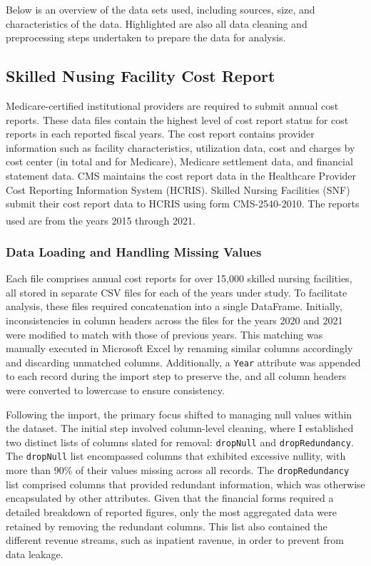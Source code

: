 \documentclass{article}
\theoremstyle{mytheoremstyle}
\theoremstyle{mytheoremstyle}
\theoremstyle{myproblemstyle}
\begin{document}
Below is an overview of the data sets used, including sources, size, and characteristics of the data. Highlighted are also all data cleaning and preprocessing steps undertaken to prepare the data for analysis.



\subsection{Skilled Nusing Facility Cost Report}

Medicare-certified institutional providers are required to submit annual cost reports. These data files contain the highest level of cost report status for cost reports in each reported fiscal years. The cost report contains provider information such as facility characteristics, utilization data, cost and charges by cost center (in total and for Medicare), Medicare settlement data, and financial statement data. CMS maintains the cost report data in the Healthcare Provider Cost Reporting Information System (HCRIS). Skilled Nursing Facilities (SNF) submit their cost report data to HCRIS using form CMS-2540-2010. The reports used are from the years 2015 through 2021.\textsuperscript{\cite{cms2023}}

\subsubsection{Data Loading and Handling Missing Values}

Each file comprises annual cost reports for over 15,000 skilled nursing facilities, all stored in separate CSV files for each of the years under study. To facilitate analysis, these files required concatenation into a single DataFrame. Initially, inconsistencies in column headers across the files for the years 2020 and 2021 were modified to match with those of previous years. This matching was manually executed in Microsoft Excel by renaming similar columns accordingly and discarding unmatched columns. Additionally, a \texttt{Year} attribute was appended to each record during the import step to preserve the, and all column headers were converted to lowercase to ensure consistency.

Following the import, the primary focus shifted to managing null values within the dataset. The initial step involved column-level cleaning, where I established two distinct lists of columns slated for removal: \texttt{dropNull} and \texttt{dropRedundancy}. The \texttt{dropNull} list encompassed columns that exhibited excessive nullity, with more than 90\% of their values missing across all records. The \texttt{dropRedundancy} list comprised columns that provided redundant information, which was otherwise encapsulated by other attributes. Given that the financial forms required a detailed breakdown of reported figures, only the most aggregated data were retained by removing the redundant columns. This list also contained the different revenue streams, such as inpatient ravenue, in order to prevent from data leakage.
\end{document}
